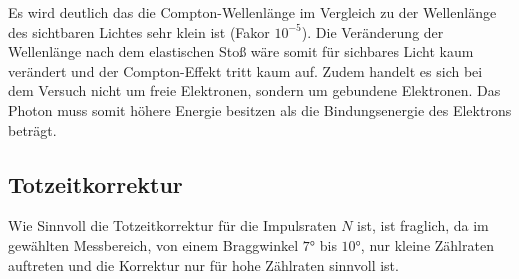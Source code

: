 Es wird deutlich das die Compton-Wellenlänge im Vergleich zu der Wellenlänge des 
sichtbaren Lichtes sehr klein ist (Fakor $10^{-5}$). Die Veränderung der Wellenlänge
nach dem elastischen Stoß wäre somit für sichbares Licht kaum verändert und der Compton-Effekt
tritt kaum auf. Zudem handelt es sich bei dem Versuch nicht um freie Elektronen, sondern
um gebundene Elektronen. Das Photon muss somit höhere Energie besitzen als die Bindungsenergie
des Elektrons beträgt.

\subsection{Totzeitkorrektur}
Wie Sinnvoll die Totzeitkorrektur für die Impulsraten $N$ ist, ist fraglich, 
da im gewählten Messbereich, von einem Braggwinkel $7$° bis $10$°, nur kleine Zählraten
auftreten und die Korrektur nur für hohe Zählraten sinnvoll ist. 

